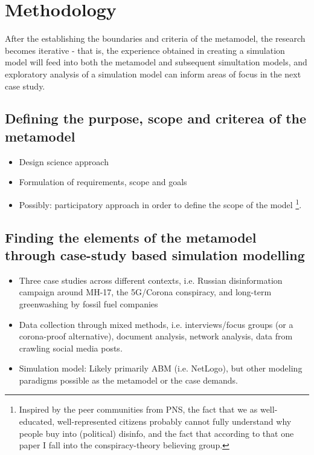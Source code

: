 \section{Methodology}
After the establishing the boundaries and criteria of the metamodel, the research becomes iterative - that is, the experience obtained in creating a simulation model will feed into both the metamodel and subsequent simultation models, and exploratory analysis of a simulation model can inform areas of focus in the next case study.

\subsection{Defining the purpose, scope and criterea of the metamodel}
\begin{itemize}
	\item Design science approach
	\item Formulation of requirements, scope and goals
	\item Possibly: participatory approach in order to define the scope of the model \footnote{Inspired by the peer communities from PNS, the fact that we as well-educated, well-represented citizens probably cannot fully understand why people buy into (political) disinfo, and the fact that according to that one paper I fall into the conspiracy-theory believing group.}. 
\end{itemize}

\subsection{Finding the elements of the metamodel through case-study based simulation modelling}
\begin{itemize}
	\item Three case studies across different contexts, i.e. Russian disinformation campaign around MH-17, the 5G/Corona conspiracy, and long-term greenwashing by fossil fuel companies
	\item Data collection through mixed methods, i.e. interviews/focus groups (or a corona-proof alternative), document analysis, network analysis, data from crawling social media posts.
	\item Simulation model: Likely primarily ABM (i.e. NetLogo), but other modeling paradigms possible as the metamodel or the case demands.
\end{itemize}

